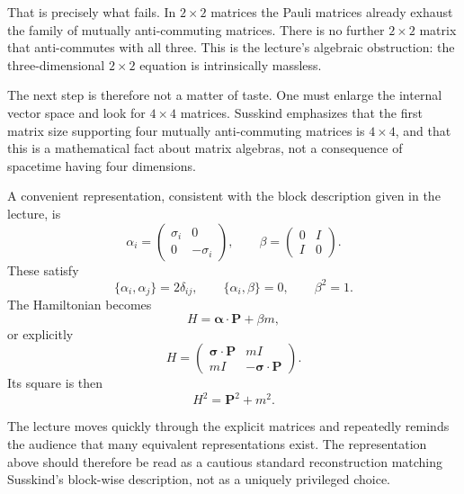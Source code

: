 That is precisely what fails. In \(2\times2\) matrices the Pauli matrices already exhaust the family of mutually anti-commuting matrices. There is no further \(2\times2\) matrix that anti-commutes with all three. This is the lecture's algebraic obstruction: the three-dimensional \(2\times2\) equation is intrinsically massless.

The next step is therefore not a matter of taste. One must enlarge the internal vector space and look for \(4\times4\) matrices. Susskind emphasizes that the first matrix size supporting four mutually anti-commuting matrices is \(4\times4\), and that this is a mathematical fact about matrix algebras, not a consequence of spacetime having four dimensions.

A convenient representation, consistent with the block description given in the lecture, is
\begin{equation}
\alpha_i=
\begin{pmatrix}
\sigma_i&0\\
0&-\sigma_i
\end{pmatrix},
\qquad
\beta=
\begin{pmatrix}
0&I\\
I&0
\end{pmatrix}.
\end{equation}
These satisfy
\begin{equation}
\{\alpha_i,\alpha_j\}=2\delta_{ij},
\qquad
\{\alpha_i,\beta\}=0,
\qquad
\beta^2=1.
\end{equation}
The Hamiltonian becomes
\begin{equation}
H=\boldsymbol{\alpha}\cdot\mathbf P+\beta m,
\end{equation}
or explicitly
\begin{equation}
H=
\begin{pmatrix}
\boldsymbol{\sigma}\cdot\mathbf P & mI\\
mI & -\boldsymbol{\sigma}\cdot\mathbf P
\end{pmatrix}.
\end{equation}
Its square is then
\begin{equation}
H^2=\mathbf P^2+m^2.
\end{equation}

\begin{remark}
The lecture moves quickly through the explicit matrices and repeatedly reminds the audience that many equivalent representations exist. The representation above should therefore be read as a cautious standard reconstruction matching Susskind's block-wise description, not as a uniquely privileged choice.
\end{remark}

